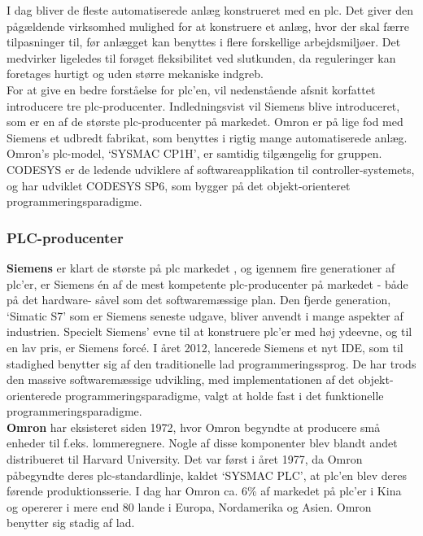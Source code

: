 I dag bliver de fleste automatiserede anlæg konstrueret med en \gls{plc}. Det giver den pågældende virksomhed mulighed for at konstruere et anlæg, hvor der skal færre tilpasninger til, før anlægget kan benyttes i flere forskellige arbejdsmiljøer. Det medvirker ligeledes til forøget fleksibilitet ved slutkunden, da reguleringer kan foretages hurtigt og uden større mekaniske indgreb.\\

\noindent For at give en bedre forståelse for \gls{plc}'en, vil nedenstående afsnit korfattet introducere tre \gls{plc}-producenter. Indledningsvist vil Siemens blive introduceret, som er en af de største \gls{plc}-producenter på markedet. Omron er på lige fod med Siemens et udbredt fabrikat, som benyttes i rigtig mange automatiserede anlæg. Omron's \gls{plc}-model, \enquote*{SYSMAC CP1H}, er samtidig tilgængelig for gruppen. CODESYS er de ledende udviklere af softwareapplikation til controller-systemets, og har udviklet CODESYS SP6, som bygger på det objekt-orienteret programmeringsparadigme.

\subsubsection*{PLC-producenter}
\label{subsec:siemens}
\noindent\textbf{Siemens} er klart de største på \gls{plc} markedet \cite{plc-marked-shares}, og igennem fire generationer af \gls{plc}'er, er Siemens én af de mest kompetente \gls{plc}-producenter på markedet - både på det hardware- såvel som det softwaremæssige plan. Den fjerde generation, \enquote*{Simatic S7} som er Siemens seneste udgave, bliver anvendt i mange aspekter af industrien. Specielt Siemens' evne til at konstruere \gls{plc}'er med høj ydeevne, og til en lav pris, er Siemens forcé. I året 2012, lancerede Siemens et nyt IDE, som til stadighed benytter sig af den traditionelle \gls{lad} programmeringssprog. De har trods den massive softwaremæssige udvikling, med implementationen af det objekt-orienterede programmeringsparadigme, valgt at holde fast i det funktionelle programmeringsparadigme. \\

\noindent\textbf{Omron} har eksisteret siden 1972, hvor Omron begyndte at producere små enheder til f.eks. lommeregnere. Nogle af disse komponenter blev blandt andet distribueret til Harvard University. Det var først i året 1977, da Omron påbegyndte deres \gls{plc}-standardlinje, kaldet \enquote*{SYSMAC PLC}, at \gls{plc}'en blev deres førende produktionsserie. I dag har Omron ca. 6\% af markedet på \gls{plc}'er i Kina og opererer i mere end 80 lande i Europa, Nordamerika og Asien\cite{plc-marked-shares}. Omron benytter sig stadig af \gls{lad}.\\

